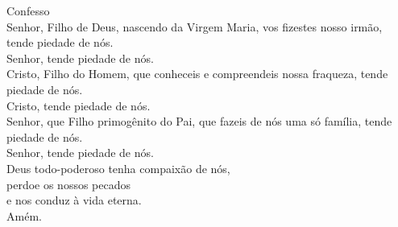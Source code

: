 \textcolor{VioletRed1}{Confesso}
\vspace{0.2cm} \\
\VbarRed{} Senhor, Filho de Deus, nascendo da Virgem Maria, vos fizestes nosso irmão, tende piedade de nós.\\
\RbarRed{} Senhor, tende piedade de nós.
\vspace{0.1cm} \\
\VbarRed{} Cristo, Filho do Homem, que conheceis e compreendeis nossa fraqueza, tende piedade de nós.\\
\RbarRed{} Cristo, tende piedade de nós.
\vspace{0.1cm} \\
\VbarRed{} Senhor, que Filho primogênito do Pai, que fazeis de nós uma só família, tende piedade de nós.\\
\RbarRed{} Senhor, tende piedade de nós.
\vspace{0.1cm} \\
Deus todo-poderoso tenha compaixão de nós, \\
perdoe os nossos pecados \\
e nos conduz à vida eterna. \\
\RbarRed{} Amém.
\vspace{0.2cm} \\
